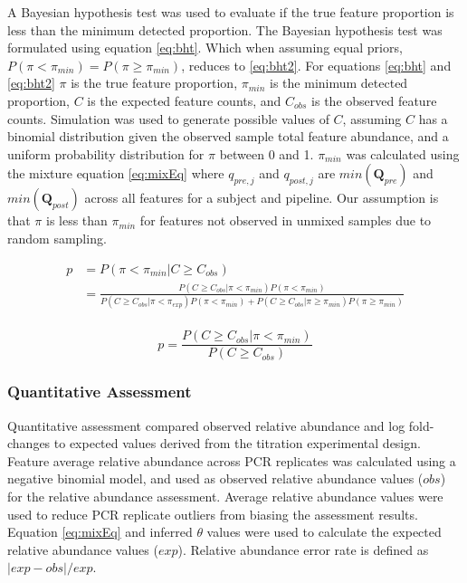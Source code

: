 \documentclass[smallextended]{svjour3}       %
\begin{document}
A Bayesian hypothesis test was used to evaluate if the true feature
proportion is less than the minimum detected proportion. The Bayesian
hypothesis test was formulated using equation \eqref{eq:bht}. Which when
assuming equal priors, \(P(\pi < \pi_{min}) = P(\pi \geq \pi_{min})\),
reduces to \eqref{eq:bht2}. For equations \eqref{eq:bht} and \eqref{eq:bht2}
\(\pi\) is the true feature proportion, \(\pi_{min}\) is the minimum
detected proportion, \(C\) is the expected feature counts, and
\(C_{obs}\) is the observed feature counts. Simulation was used to
generate possible values of \(C\), assuming \(C\) has a binomial
distribution given the observed sample total feature abundance, and a
uniform probability distribution for \(\pi\) between 0 and 1.
\(\pi_{min}\) was calculated using the mixture equation \eqref{eq:mixEq}
where \(q_{pre,j}\) and \(q_{post,j}\) are \(min(\textbf{Q}_{pre})\) and
\(min(\textbf{Q}_{post})\) across all features for a subject and
pipeline. Our assumption is that \(\pi\) is less than \(\pi_{min}\) for
features not observed in unmixed samples due to random sampling.

\begin{equation}
  \begin{split}
    p & = P(\pi < \pi_{min} | C \geq C_{obs}) \\
      & = \frac{P(C \geq C_{obs}| \pi < \pi_{min})P(\pi < \pi_{min})}{P(C \geq C_{obs}| \pi < \pi_{exp})P(\pi < \pi_{min}) + P(C \geq C_{obs}| \pi \geq \pi_{min})P(\pi \geq \pi_{min})} \\
  \end{split}
  \label{eq:bht}
\end{equation}

\begin{equation}
    p = \frac{P(C \geq C_{obs}| \pi < \pi_{min})}{P(C \geq C_{obs})}
  \label{eq:bht2}
\end{equation}

\hypertarget{quantitative-assessment}{%
\subsubsection{Quantitative Assessment}\label{quantitative-assessment}}

Quantitative assessment compared observed relative abundance and log
fold-changes to expected values derived from the titration experimental
design. Feature average relative abundance across PCR replicates was
calculated using a negative binomial model, and used as observed
relative abundance values (\(obs\)) for the relative abundance
assessment. Average relative abundance values were used to reduce PCR
replicate outliers from biasing the assessment results. Equation
\eqref{eq:mixEq} and inferred \(\theta\) values were used to calculate the
expected relative abundance values (\(exp\)). Relative abundance error
rate is defined as \(|exp - obs|/exp\).
\end{document}
